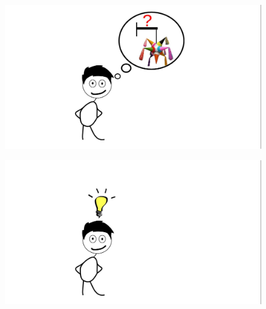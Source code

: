 \begin{frame}
\begin{figure}

\vspace{-.7cm}	
\hspace{-2cm}		\includegraphics[width=1.2\linewidth]{Pictures/animations/animation_1_1.png}
		\end{figure}

\end{frame}

\begin{frame}
\begin{figure}

\vspace{-.7cm}	
\hspace{-2cm}		\includegraphics[width=1.2\linewidth]{Pictures/animations/animation_2_2.png}
		\end{figure}

\end{frame}

